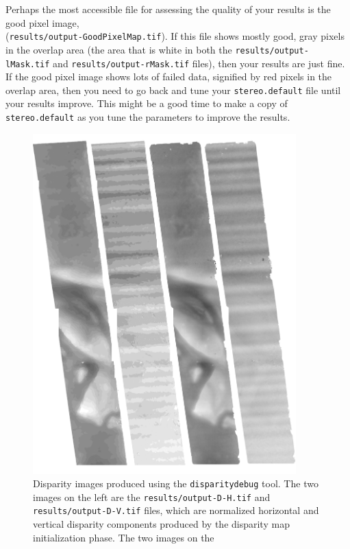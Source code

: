 Perhaps the most accessible file for assessing the quality of your
results is the good pixel image,
\\ (\texttt{results/output-GoodPixelMap.tif}).  If this file shows
mostly good, gray pixels in the overlap area (the area that is white
in both the \texttt{results/output-lMask.tif} and
\texttt{results/output-rMask.tif} files), then your results are
just fine.  If the good pixel image shows lots of failed data,
signified by red pixels in the overlap area, then you need to go back
and tune your \texttt{stereo.default} file until your results improve.
This might be a good time to make a copy of \texttt{stereo.default} as
you tune the parameters to improve the results.
\begin{figure}[b!]
\begin{minipage}{4in}
\includegraphics[width=4in]{images/p19-disparity.png}
\end{minipage}
\hfill
\begin{minipage}{2.7in}
\caption[P19 disparity images]{
    \label{p19-disparity}
	Disparity images produced using the \texttt{disparitydebug}
        tool.  The two images on the left are the
        \texttt{results/output-D-H.tif} and
        \texttt{results/output-D-V.tif} files, which are normalized
        horizontal and vertical disparity components produced by the
        disparity map initialization phase.  The two images on the
}
\end{minipage}
\end{figure}

